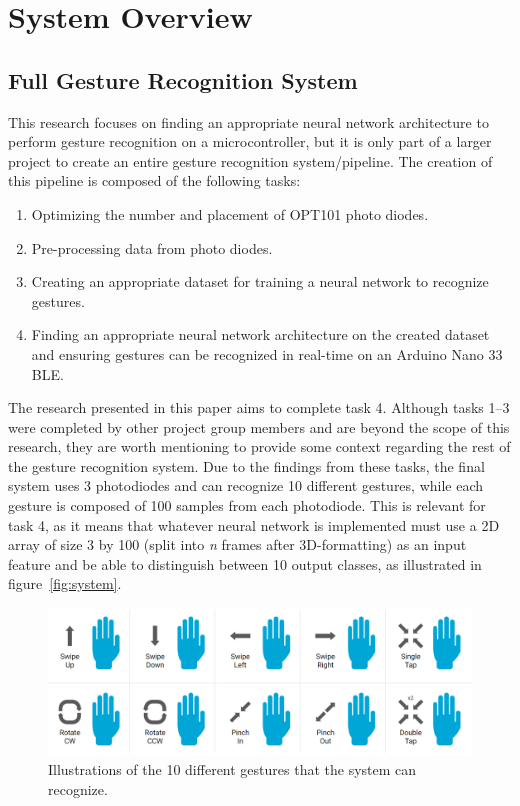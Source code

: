 \section{System Overview}\label{sec:system-overview}
\subsection{Full Gesture Recognition System}\label{subsec:full-gesture-recognition-pipeline}
This research focuses on finding an appropriate neural network architecture to perform gesture recognition on a microcontroller, but it is only part of a larger project to create an entire gesture recognition system/pipeline.
The creation of this pipeline is composed of the following tasks:
\begin{enumerate}
    \item Optimizing the number and placement of OPT101 photo diodes.
    \item Pre-processing data from photo diodes.
    \item Creating an appropriate dataset for training a neural network to recognize gestures.
    \item Finding an appropriate neural network architecture on the created dataset and ensuring gestures can be recognized in real-time on an Arduino Nano 33 BLE\@.
\end{enumerate}

The research presented in this paper aims to complete task 4.
Although tasks 1--3 were completed by other project group members and are beyond the scope of this research, they are worth mentioning to provide some context regarding the rest of the gesture recognition system.
Due to the findings from these tasks, the final system uses 3 photodiodes and can recognize 10 different gestures, while each gesture is composed of 100 samples from each photodiode.
This is relevant for task 4, as it means that whatever neural network is implemented must use a 2D array of size 3 by 100 (split into \textit{n} frames after 3D-formatting) as an input feature and be able to distinguish between 10 output classes, as illustrated in figure~\ref{fig:system}.

\begin{figure}[h]
    \centering
    \captionsetup{justification=centering}
    \includegraphics[width=\linewidth]{figures/gestures}
    \caption{Illustrations of the 10 different gestures that the system can recognize.}
    \label{fig:gestures}
\end{figure}

